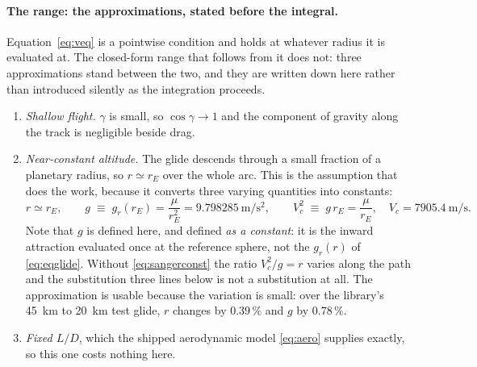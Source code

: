 \documentclass[11pt]{article}
\begin{document}
\paragraph{The range: the approximations, stated before the integral.}
Equation~\eqref{eq:veq} is a pointwise condition and holds at whatever radius
it is evaluated at. The closed-form range that follows from it does not: three
approximations stand between the two, and they are written down here rather
than introduced silently as the integration proceeds.

\begin{enumerate}
\item \emph{Shallow flight.} $\gamma$ is small, so $\cos\gamma\to 1$ and the
component of gravity along the track is negligible beside drag.
\item \emph{Near-constant altitude.} The glide descends through a small
fraction of a planetary radius, so $r\simeq r_E$ over the whole arc. This is
the assumption that does the work, because it converts three varying
quantities into constants:
\begin{equation}
  r \simeq r_E , \qquad
  g \;\equiv\; g_r(r_E) = \frac{\mu}{r_E^2} = 9.798285~\mathrm{m/s^2},
  \qquad
  V_c^2 \;\equiv\; g\,r_E = \frac{\mu}{r_E},
  \quad V_c = 7905.4~\mathrm{m/s} .
  \label{eq:sangerconst}
\end{equation}
Note that $g$ is defined here, and defined \emph{as a constant}: it is the
inward attraction evaluated once at the reference sphere, not the $g_r(r)$ of
\eqref{eq:eqglide}. Without \eqref{eq:sangerconst} the ratio $V_c^2/g = r$
varies along the path and the substitution three lines below is not a
substitution at all. The approximation is usable because the variation is
small: over the library's 45~km to 20~km test glide, $r$ changes by
$0.39\,\%$ and $g$ by $0.78\,\%$.
\item \emph{Fixed $L/D$}, which the shipped aerodynamic model \eqref{eq:aero}
supplies exactly, so this one costs nothing here.
\end{enumerate}
\end{document}
